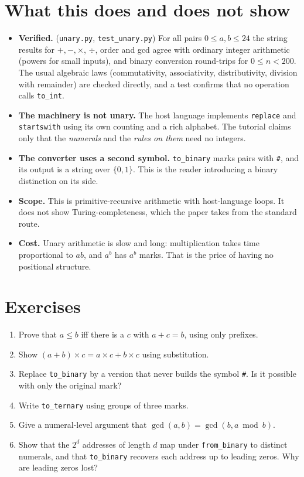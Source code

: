 \documentclass[11pt]{article}
\begin{document}
\section{What this does and does not show}
\begin{itemize}
  \item \textbf{Verified.} (\texttt{unary.py}, \texttt{test\_unary.py}) For all
        pairs $0\le a,b\le 24$ the string results for $+,-,\times$, $\div$, order and
        gcd agree with ordinary integer arithmetic (powers for small inputs), and
        binary conversion round-trips for $0\le n<200$. The usual algebraic laws
        (commutativity, associativity, distributivity, division with remainder) are
        checked directly, and a test confirms that no operation calls \texttt{to\_int}.
  \item \textbf{The machinery is not unary.} The host language implements
        \texttt{replace} and \texttt{startswith} using its own counting and a rich
        alphabet. The tutorial claims only that the \emph{numerals} and the
        \emph{rules on them} need no integers.
  \item \textbf{The converter uses a second symbol.} \texttt{to\_binary} marks pairs
        with \texttt{\#}, and its output is a string over $\{0,1\}$. This is the
        reader introducing a binary distinction on its side.
  \item \textbf{Scope.} This is primitive-recursive arithmetic with host-language
        loops. It does not show Turing-completeness, which the paper takes from the
        standard route.
  \item \textbf{Cost.} Unary arithmetic is slow and long: multiplication takes time
        proportional to $ab$, and $a^b$ has $a^b$ marks. That is the price of having
        no positional structure.
\end{itemize}

\section*{Exercises}
\begin{enumerate}
  \item Prove that $a\le b$ iff there is a $c$ with $a+c=b$, using only prefixes.
  \item Show $(a+b)\times c = a\times c + b\times c$ using substitution.
  \item Replace \texttt{to\_binary} by a version that never builds the symbol
        \texttt{\#}. Is it possible with only the original mark?
  \item Write \texttt{to\_ternary} using groups of three marks.
  \item Give a numeral-level argument that $\gcd(a,b)=\gcd(b,a \bmod b)$.
  \item Show that the $2^d$ addresses of length $d$ map under \texttt{from\_binary}
        to distinct numerals, and that \texttt{to\_binary} recovers each address up
        to leading zeros. Why are leading zeros lost?
\end{enumerate}
\end{document}
